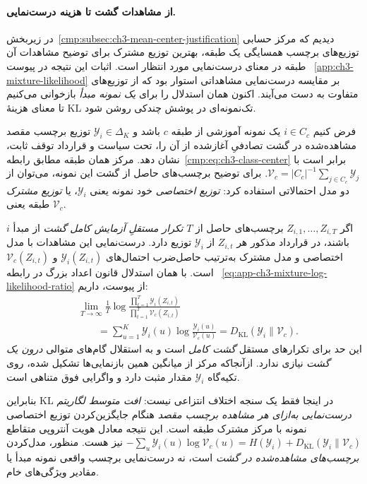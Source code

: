 \paragraph{از مشاهدات گشت تا هزینه درست‌نمایی.}
در زیربخش~\ref{cmp:subsec:ch3-mean-center-justification}
دیدیم که مرکز حسابی توزیع‌های
برچسب همسایگی یک طبقه، بهترین
توزیع مشترک برای توضیح مشاهدات
آن طبقه در معنای درست‌نمایی
مورد انتظار است. اثبات این
نتیجه در پیوست~
\ref{app:ch3-mixture-likelihood}
بر مقایسه درست‌نمایی مشاهداتی
استوار بود که از توزیع‌های
متفاوت به دست می‌آیند.
اکنون همان استدلال را برای
\emph{یک نمونه مبدأ} بازخوانی می‌کنیم تا معنای
هزینهٔ KL تک‌نمونه‌ای در پوشش چندکی روشن شود.

فرض کنیم $i\in C_c$ یک نمونه
آموزشی از طبقه $c$ باشد و
$\mathscr Y_i\in\Delta_K$
توزیع برچسب مقصد مشاهده‌شده
در گشت تصادفیِ آغازشده از آن
را، تحت سیاست و قرارداد
توقف ثابت، نشان دهد.
مرکز همان طبقه مطابق
رابطه~\eqref{cmp:eq:ch3-class-center}
برابر است با
$\mathcal V_c=|C_c|^{-1}
\sum_{j\in C_c}\mathscr Y_j$.
برای توضیح برچسب‌های حاصل
از گشت این نمونه، می‌توان
از دو مدل احتمالاتی استفاده کرد:
\emph{توزیع اختصاصی} خود نمونه
یعنی $\mathscr Y_i$، یا
\emph{توزیع مشترک} طبقه
یعنی $\mathcal V_c$.

اگر $Z_{i,1},\ldots,Z_{i,T}$
برچسب‌های حاصل از $T$
\emph{تکرار مستقلِ آزمایش کامل گشت}
از مبدأ $i$ باشند، در قرارداد
مذکور هر $Z_{i,t}$ از
$\mathscr Y_i$ توزیع دارد.
درست‌نمایی این مشاهدات
با مدل اختصاصی و مدل مشترک
به‌ترتیب حاصل‌ضرب احتمال‌های
$\mathscr Y_i(Z_{i,t})$
و $\mathcal V_c(Z_{i,t})$
است. با همان استدلال قانون
اعداد بزرگ در رابطه~
\eqref{eq:app-ch3-mixture-log-likelihood-ratio}
از پیوست، داریم:
\begin{equation}\label{cmp:eq:ch3-outlier-kl-likelihood-decomposition}
\boxed{
\begin{aligned}
&\lim_{T\to\infty}\frac1T
\log\frac{
\prod_{t=1}^{T}\mathscr Y_i(Z_{i,t})
}{
\prod_{t=1}^{T}\mathcal V_c(Z_{i,t})
}\\
&\qquad
=\sum_{u=1}^{K}\mathscr Y_i(u)
\log\frac{\mathscr Y_i(u)}{\mathcal V_c(u)}
=D_{\mathrm{KL}}(\mathscr Y_i\|\mathcal V_c).
\end{aligned}}
\end{equation}
این حد برای تکرارهای مستقل
\emph{گشت کامل} است و به
استقلال گام‌های متوالی
\emph{درون یک گشت} نیازی ندارد.
ازآنجاکه مرکز از میانگین
همین بازنمایی‌ها تشکیل شده،
روی تکیه‌گاه $\mathscr Y_i$
مقدار مثبت دارد و واگرایی
فوق متناهی است.

بنابراین KL در اینجا فقط
یک سنجه اختلاف انتزاعی نیست:
\emph{افت متوسط لگاریتم درست‌نمایی
به‌ازای هر مشاهده برچسب مقصد}
هنگام جایگزین‌کردن توزیع
اختصاصی نمونه با مرکز مشترک
طبقه است. این نتیجه معادل
هویت آنتروپی متقاطع
$-\sum_u\mathscr Y_i(u)
\log\mathcal V_c(u)
=H(\mathscr Y_i)+
D_{\mathrm{KL}}(\mathscr Y_i\|\mathcal V_c)$
نیز هست. منظور، مدل‌کردن
\emph{برچسب‌های مشاهده‌شده در گشت}
است، نه درست‌نمایی برچسب
واقعی نمونه مبدأ یا مقادیر
ویژگی‌های خام.


